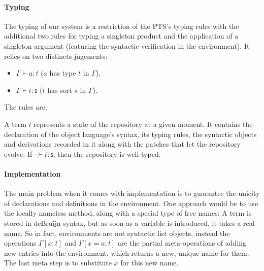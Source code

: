 \documentclass[12pt]{article}
\newcommand{\sort}{\textsf{s}}
\newcommand{\subst}[2]{\{#1/#2\}}
\begin{document}
\paragraph{Typing} The typing of our system is a restriction of the
PTS's typing rules with the additional two rules for typing a singleton
product and the application of a singleton argument (featuring the
syntactic verification in the environment). It relies on two distincts
jugements:
\begin{itemize}
\item $\Gamma\vdash a : t$ ($a$ has type $t$ in $\Gamma$),
\item $\Gamma\vdash t : \sort$ ($t$ has sort $s$ in $\Gamma$).
\end{itemize}
The rules are:

A term $t$ represents a state of the repository at a given moment. It
contains the declaration of the object language's syntax, its typing
rules, the syntactic objects and derivations recorded in it along with
the patches that let the repository evolve. If $\cdot\vdash t:\sort$,
then the repository is well-typed.

\paragraph{Implementation}

The main problem when it comes with implementation is to guarantee the
unicity of declarations and definitions in the environment. One
approach would be to use the locally-nameless method, along with a
special type of free names: A term is stored in deBruijn syntax, but
as soon as a variable is introduced, it takes a real name. So in fact,
environments are not syntactic list objects, instead the operations
$\Gamma[x:t]$ and $\Gamma[x=a:t]$ are the partial meta-operations of
adding new entries into the environment, which returns a new, unique
name for them. The last meta step is to substitute $x$ for this new
name.
\end{document}
